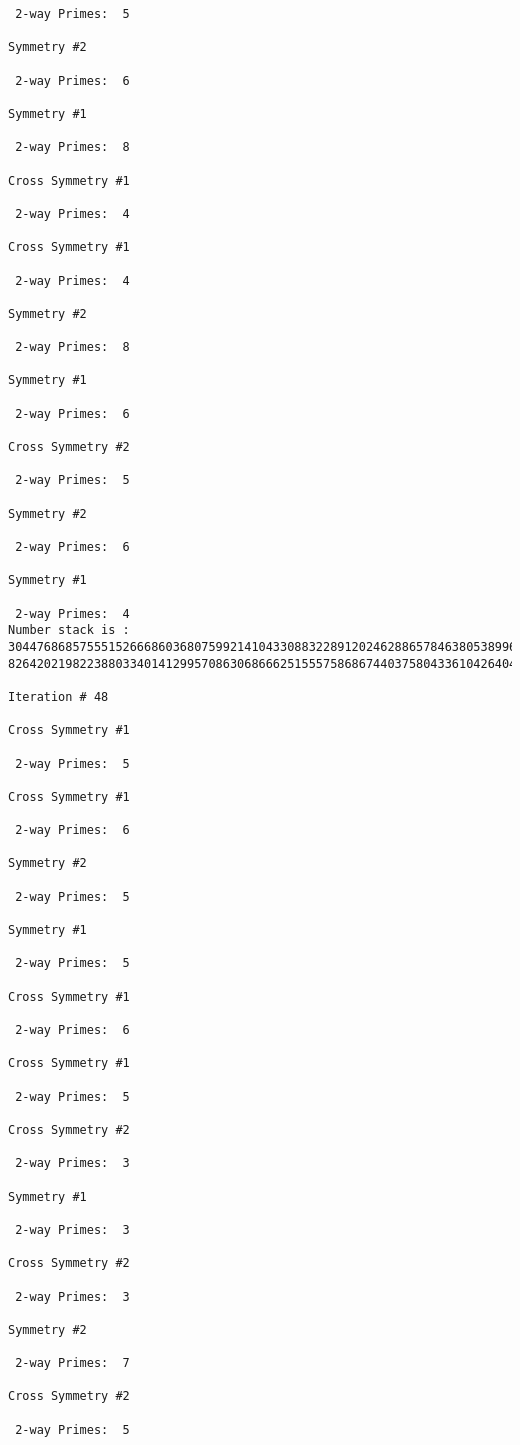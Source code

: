 \begin{verbatim}
 2-way Primes: 	5

Symmetry #2

 2-way Primes: 	6

Symmetry #1

 2-way Primes: 	8

Cross Symmetry #1

 2-way Primes: 	4

Cross Symmetry #1

 2-way Primes: 	4

Symmetry #2

 2-way Primes: 	8

Symmetry #1

 2-way Primes: 	6

Cross Symmetry #2

 2-way Primes: 	5

Symmetry #2

 2-way Primes: 	6

Symmetry #1

 2-way Primes: 	4
Number stack is :
30447686857555152666860368075992141043308832289120246288657846380538996794608835958544046240163340857
82642021982238803340141299570863068666251555758686744037580433610426404458595388064976998350836487568

Iteration #	48

Cross Symmetry #1

 2-way Primes: 	5

Cross Symmetry #1

 2-way Primes: 	6

Symmetry #2

 2-way Primes: 	5

Symmetry #1

 2-way Primes: 	5

Cross Symmetry #1

 2-way Primes: 	6

Cross Symmetry #1

 2-way Primes: 	5

Cross Symmetry #2

 2-way Primes: 	3

Symmetry #1

 2-way Primes: 	3

Cross Symmetry #2

 2-way Primes: 	3

Symmetry #2

 2-way Primes: 	7

Cross Symmetry #2

 2-way Primes: 	5


\end{verbatim}
